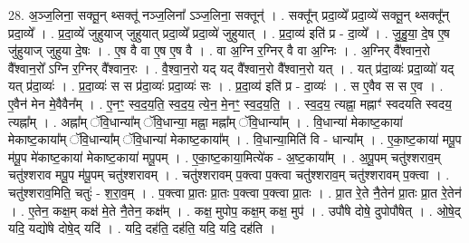 \documentclass[17pt]{extarticle}
\begin{document}
28. अ॒ञ्ज॒लिना॒ सक्तू॒न् थ्सक्तू॑ नञ्ज॒लिना᳚ ऽञ्ज॒लिना॒ सक्तून्॑ । . सक्तू᳚न् प्रदा॒व्ये᳚ प्रदा॒व्ये॑ सक्तू॒न् थ्सक्तू᳚न् प्रदा॒व्ये᳚ । . प्र॒दा॒व्ये॑ जुहुयाज् जुहुयात् प्रदा॒व्ये᳚ प्रदा॒व्ये॑ जुहुयात् । . प्र॒दा॒व्य॑ इति॑ प्र - दा॒व्ये᳚ । . जु॒हु॒या॒ दे॒ष ए॒ष जु॑हुयाज् जुहुया दे॒षः । . ए॒ष वै वा ए॒ष ए॒ष वै । . वा अ॒ग्नि र॒ग्निर् वै वा अ॒ग्निः । . अ॒ग्निर् वै᳚श्वान॒रो वै᳚श्वान॒रो᳚ ऽग्नि र॒ग्निर् वै᳚श्वान॒रः । . वै॒श्वा॒न॒रो यद् यद् वै᳚श्वान॒रो वै᳚श्वान॒रो यत् । . यत् प्र॑दा॒व्यः॑ प्रदा॒व्यो॑ यद् यत् प्र॑दा॒व्यः॑ । . प्र॒दा॒व्यः॑ स स प्र॑दा॒व्यः॑ प्रदा॒व्यः॑ सः । . प्र॒दा॒व्य॑ इति॑ प्र - दा॒व्यः॑ । . स ए॒वैव स स ए॒व । . ए॒वैन॑ मेन मे॒वैवैन᳚म् । . ए॒नꣳ॒॒ स्व॒द॒य॒ति॒ स्व॒द॒य॒ त्ये॒न॒ मे॒नꣳ॒॒ स्व॒द॒य॒ति॒ । . स्व॒द॒य॒ त्यह्ना॒ मह्नाꣳ॑ स्वदयति स्वदय॒ त्यह्ना᳚म् । . अह्ना᳚म् ॅवि॒धान्या᳚म् ॅवि॒धान्या॒ मह्ना॒ मह्ना᳚म् ॅवि॒धान्या᳚म् । . वि॒धान्या॑ मेकाष्ट॒काया॑ मेकाष्ट॒काया᳚म् ॅवि॒धान्या᳚म् ॅवि॒धान्या॑ मेकाष्ट॒काया᳚म् । . वि॒धान्या॒मिति॑ वि - धान्या᳚म् । . ए॒का॒ष्ट॒काया॑ मपू॒प म॑पू॒प मे॑काष्ट॒काया॑ मेकाष्ट॒काया॑ मपू॒पम् । . ए॒का॒ष्ट॒काया॒मित्ये॑क - अ॒ष्ट॒काया᳚म् । . अ॒पू॒पम् चतु॑श्शराव॒म् चतु॑श्शराव मपू॒प म॑पू॒पम् चतु॑श्शरावम् । . चतु॑श्शरावम् प॒क्त्वा प॒क्त्वा चतु॑श्शराव॒म् चतु॑श्शरावम् प॒क्त्वा । . चतु॑श्शराव॒मिति॒ चतुः॑ - श॒रा॒व॒म् । . प॒क्त्वा प्रा॒तः प्रा॒तः प॒क्त्वा प॒क्त्वा प्रा॒तः । . प्रा॒त रे॒ते नै॒तेन॑ प्रा॒तः प्रा॒त रे॒तेन॑ । . ए॒तेन॒ कक्ष॒म् कक्ष॑ मे॒ते नै॒तेन॒ कक्ष᳚म् । . कक्ष॒ मुपोप॒ कक्ष॒म् कक्ष॒ मुप॑ । . उपौ॑षे दोषे॒ दुपोपौ॑षेत् । . ओ॒षे॒द् यदि॒ यद्यो॑षे दोषे॒द् यदि॑ । . यदि॒ दह॑ति॒ दह॑ति॒ यदि॒ यदि॒ दह॑ति । \newline
\end{document}
